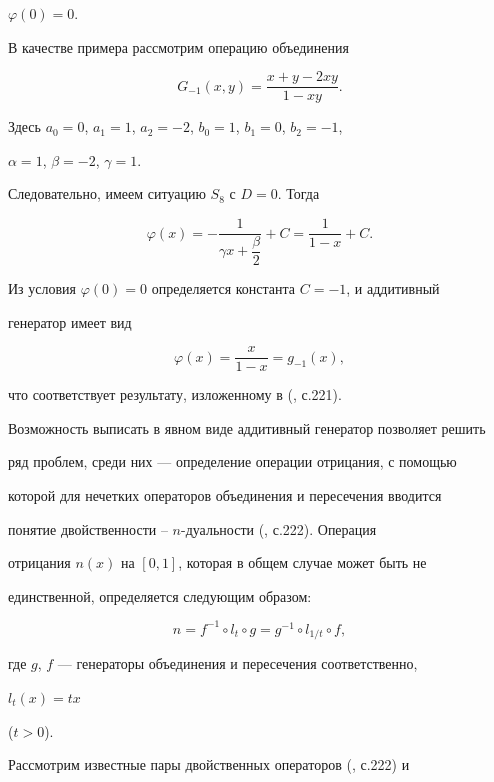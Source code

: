 $\varphi(0)=0$.





В качестве примера рассмотрим операцию объединения


$$


G_{-1}(x,y)=\frac{x+y-2xy}{1-xy}.


$$


Здесь $a_0=0$, $a_1=1$, $a_2=-2$, $b_0=1$, $b_1=0$, $b_2=-1$,


$\alpha=1$, $\beta=-2$, $\gamma=1$.


Следовательно, имеем ситуацию $S_8$ с $D=0$. Тогда


$$


\varphi(x)=-\frac{1}{\gamma x+\dfrac{\beta}{2}}+C=


\frac{1}{1-x}+C.


$$


Из условия $\varphi(0)=0$ определяется константа $C=-1$, и аддитивный


генератор имеет вид


$$


\varphi(x)=\frac{x}{1-x}=g_{-1}(x),


$$


что соответствует результату, изложенному в (\cite{Tri}, с.221).





Возможность выписать в явном виде аддитивный генератор позволяет решить


ряд проблем, среди них --- определение операции отрицания, с помощью


которой для нечетких операторов объединения и пересечения вводится


понятие двойственности -- $n$-дуальности (\cite{Tri}, с.222). Операция


отрицания $n(x)$ на $[0,1]$, которая в общем случае может быть не


единственной, определяется следующим образом:


$$


n=f^{-1}\circ l_t\circ g=g^{-1}\circ l_{1/t}\circ f,


$$


где $g$, $f$ --- генераторы объединения и пересечения соответственно,


$l_t(x)=tx$


($t>0$).





Рассмотрим известные пары двойственных операторов (\cite{Tri}, с.222) и


